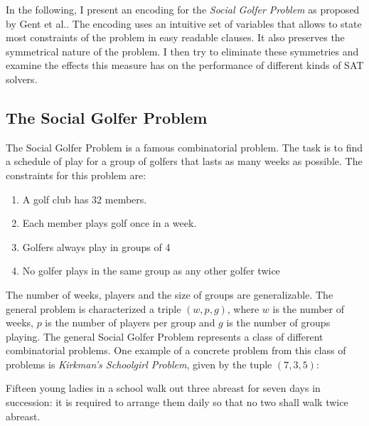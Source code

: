 \documentclass[a4paper]{scrartcl}
\begin{document}
In the following, I present an encoding for the \emph{Social Golfer Problem} as proposed by Gent et al.\cite{Gent05}. The encoding uses an intuitive set of variables that allows to state most constraints of the problem in easy readable clauses. It also preserves the symmetrical nature of the problem. I then try to eliminate these symmetries and examine the effects this measure has on the performance of different kinds of SAT solvers.

\subsection{The Social Golfer Problem}

The Social Golfer Problem is a famous combinatorial problem. The task is to find a schedule of play for a group of golfers that lasts as many weeks as possible. The constraints for this problem are:

\begin{mdframed}[skipabove=\baselineskip, skipbelow=\baselineskip, leftmargin=20, rightmargin=20]

\begin{enumerate}
    \item A golf club has 32 members.
    \item Each member plays golf once in a week.
    \item Golfers always play in groups of 4
    \item No golfer plays in the same group as any other golfer twice
\end{enumerate}

\end{mdframed}

The number of weeks, players and the size of groups are generalizable. The general problem is characterized a triple $(w,p,g)$, where $w$ is the number of weeks, $p$ is the number of players per group and $g$ is the number of groups playing. The general Social Golfer Problem represents a class of different combinatorial problems. One example of a concrete problem from this class of problems is \emph{Kirkman's Schoolgirl Problem}, given by the tuple $(7,3,5)$:

\begin{mdframed}[skipabove=\baselineskip, skipbelow=\baselineskip, leftmargin=20, rightmargin=20]

Fifteen young ladies in a school walk out three abreast for seven days in succession: it is required to arrange them daily so that no two shall walk twice abreast.

\end{mdframed}
\end{document}
